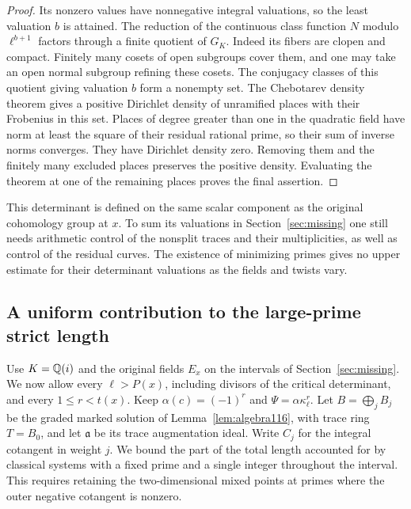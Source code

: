 \documentclass[a4paper,11pt]{article}
\theoremstyle{definition}
\theoremstyle{remark}
\numberwithin{equation}{section}
\begin{document}
\begin{proof}
Its nonzero values have nonnegative integral valuations, so the
least valuation \(b\) is attained. The reduction of the continuous
class function \(N\) modulo \(\ell^{b+1}\) factors through a
finite quotient of \(G_K\). Indeed its fibers are clopen and
compact. Finitely many cosets of open subgroups cover them, and
one may take an open normal subgroup refining these cosets. The
conjugacy classes of this quotient giving valuation \(b\) form a
nonempty set. The Chebotarev density theorem gives a positive
Dirichlet density of unramified places with their Frobenius in
this set. Places of degree greater than one in the quadratic
field have norm at least the square of their residual rational
prime, so their sum of inverse norms converges. They have
Dirichlet density zero. Removing them and the finitely many
excluded places preserves the positive density. Evaluating the
theorem at one of the remaining places proves the final assertion.
\end{proof}

This determinant is defined on the same scalar component as
the original cohomology group at \(x\). To sum its valuations
in Section~\ref{sec:missing} one still needs arithmetic control of
the nonsplit traces and their multiplicities, as well as control
of the residual curves. The existence of minimizing primes gives
no upper estimate for their determinant valuations as the fields
and twists vary.


\subsection{A uniform contribution to the large-prime strict length}
\label{sec:gaussianbudget401}

Use \(K=\mathbb Q(i)\) and the original fields \(E_x\) on the intervals
of Section~\ref{sec:missing}. We now allow every \(\ell>P(x)\),
including divisors of the critical determinant, and every
\(1\le r<t(x)\). Keep \(\alpha(c)=(-1)^r\) and
\(\Psi=\alpha\kappa_\ell^r\). Let \(B=\bigoplus_j B_j\) be the
graded marked solution of Lemma~\ref{lem:algebra116}, with trace
ring \(T=B_0\), and let \(\mathfrak a\) be its trace augmentation
ideal. Write \(C_j\) for the integral cotangent in weight \(j\).
We bound the part of the total length accounted for by classical
systems with a fixed prime and a single integer throughout the
interval. This requires retaining the two-dimensional mixed
points at primes where the outer negative cotangent is nonzero.
\end{document}
